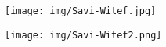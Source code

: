 \begin{figure}[htb]
	\centering
	\texttt{[image: img/Savi-Witef.jpg]}
	\label{fig:anexo8}\\
\end{figure}

\newpage

\begin{figure}[htb]
	\centering
	\texttt{[image: img/Savi-Witef2.png]}
	\label{fig:anexo9}\\
\end{figure}
